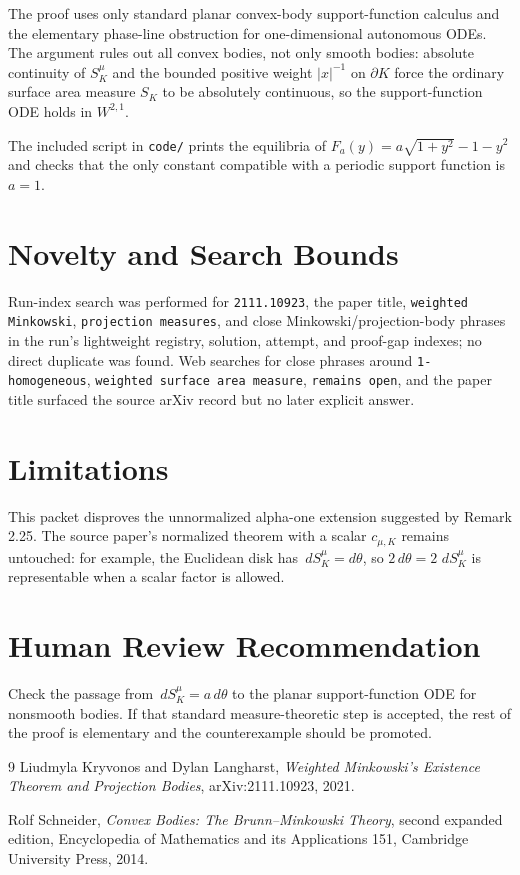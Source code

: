 \documentclass[11pt]{article}
\newcommand{\dd}{\,d}
\begin{document}
The proof uses only standard planar convex-body support-function calculus and
the elementary phase-line obstruction for one-dimensional autonomous ODEs.
The argument rules out all convex bodies, not only smooth bodies: absolute
continuity of \(S^\mu_K\) and the bounded positive weight \(|x|^{-1}\) on
\(\partial K\) force the ordinary surface area measure \(S_K\) to be
absolutely continuous, so the support-function ODE holds in \(W^{2,1}\).

The included script in \texttt{code/} prints the equilibria of
\(F_a(y)=a\sqrt{1+y^2}-1-y^2\) and checks that the only constant compatible
with a periodic support function is \(a=1\).

\section*{Novelty and Search Bounds}

Run-index search was performed for \texttt{2111.10923}, the paper title,
\texttt{weighted Minkowski}, \texttt{projection measures}, and close
Minkowski/projection-body phrases in the run's lightweight registry,
solution, attempt, and proof-gap indexes; no direct duplicate was found.
Web searches for close phrases around
\texttt{1-homogeneous}, \texttt{weighted surface area measure},
\texttt{remains open}, and the paper title surfaced the source arXiv record
but no later explicit answer.

\section*{Limitations}

This packet disproves the unnormalized alpha-one extension suggested by
Remark 2.25.  The source paper's normalized theorem with a scalar
\(c_{\mu,K}\) remains untouched: for example, the Euclidean disk has
\(\dd S^\mu_K=d\theta\), so \(2\,d\theta=2\,\dd S^\mu_K\) is representable
when a scalar factor is allowed.

\section*{Human Review Recommendation}

Check the passage from \(\dd S^\mu_K=a\,d\theta\) to the planar
support-function ODE for nonsmooth bodies.  If that standard measure-theoretic
step is accepted, the rest of the proof is elementary and the counterexample
should be promoted.

\begin{thebibliography}{9}
Liudmyla Kryvonos and Dylan Langharst,
\emph{Weighted Minkowski's Existence Theorem and Projection Bodies},
arXiv:2111.10923, 2021.

Rolf Schneider,
\emph{Convex Bodies: The Brunn--Minkowski Theory},
second expanded edition, Encyclopedia of Mathematics and its Applications 151,
Cambridge University Press, 2014.
\end{thebibliography}
\end{document}
